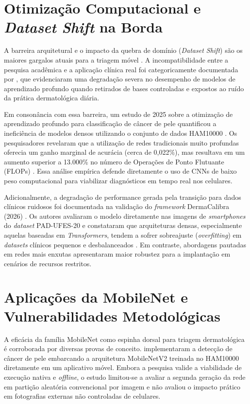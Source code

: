 \documentclass[oneside,english,brazilian]{UNISINOSmonografia}
\begin{document}
\section{Otimização Computacional e \textit{Dataset Shift} na Borda}
A barreira arquitetural e o impacto da quebra de domínio (\textit{Dataset Shift}) são os maiores gargalos atuais para a triagem móvel \cite{wolf2025deep}. A incompatibilidade entre a pesquisa acadêmica e a aplicação clínica real foi categoricamente documentada por , que evidenciaram uma degradação severa no desempenho de modelos de aprendizado profundo quando retirados de bases controladas e expostos ao ruído da prática dermatológica diária. 

Em consonância com essa barreira, um estudo de 2025 sobre a otimização de aprendizado profundo para classificação de câncer de pele quantificou a ineficiência de modelos densos utilizando o conjunto de dados HAM10000 \cite{optimizing2025skin}. Os pesquisadores revelaram que a utilização de redes tradicionais muito profundas oferecia um ganho marginal de acurácia (cerca de 0,022\%), mas resultava em um aumento superior a 13.000\% no número de Operações de Ponto Flutuante (FLOPs) \cite{optimizing2025skin}. Essa análise empírica defende diretamente o uso de CNNs de baixo peso computacional para viabilizar diagnósticos em tempo real nos celulares.

Adicionalmente, a degradação de performance gerada pela transição para dados clínicos ruidosos foi documentada na validação do \textit{framework} DermaCalibra (2026) \cite{dermacalibra2026}. Os autores avaliaram o modelo diretamente nas imagens de \textit{smartphones} do \textit{dataset} PAD-UFES-20 \cite{pacheco2020pad} e constataram que arquiteturas densas, especialmente aquelas baseadas em \textit{Transformers}, tendem a sofrer sobreajuste (\textit{overfitting}) em \textit{datasets} clínicos pequenos e desbalanceados \cite{dermacalibra2026}. Em contraste, abordagens pautadas em redes mais enxutas apresentaram maior robustez para a implantação em cenários de recursos restritos.

\section{Aplicações da MobileNet e Vulnerabilidades Metodológicas}
A eficácia da família MobileNet como espinha dorsal para triagem dermatológica é corroborada por diversas provas de conceito.  implementaram a detecção de câncer de pele embarcando a arquitetura MobileNetV2 treinada no HAM10000 diretamente em um aplicativo móvel. Embora a pesquisa valide a viabilidade de execução nativa e \textit{offline}, o estudo limitou-se a avaliar a segunda geração da rede em partição aleatória convencional por imagem e não avaliou o impacto prático em fotografias externas não controladas de celulares.
\end{document}
